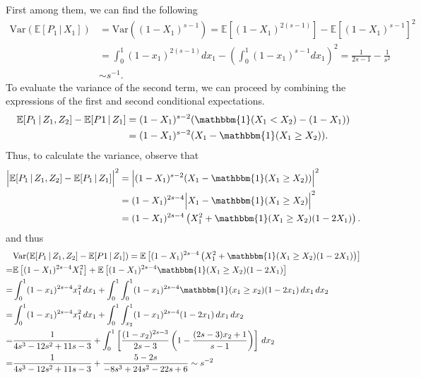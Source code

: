 \documentclass[letterpaper,10pt]{article}
\numberwithin{equation}{section}
\numberwithin{thm}{section}
\numberwithin{lem}{section}
\numberwithin{cor}{section}
\newcommand{\E}{\mathbb{E}}
\newcommand{\1}{\mathbb{1}}
\newcommand{\Var}{\text{Var}}
\begin{document}
First among them, we can find the following
\begin{equation*}
	\begin{aligned}
		\Var(\E[P_1 \, | \, X_1])
		 & = \Var\left((1-X_1)^{s-1}\right)
		= \E\left[(1-X_1)^{2(s-1)}\right] - \E\left[(1-X_1)^{s-1}\right]^2                         \\
		 & = \int_{0}^{1} (1-x_1)^{2(s-1)} d x_1 - \left(\int_{0}^{1} (1-x_1)^{s-1} d x_1\right)^2
		= \frac{1}{2s - 1} - \frac{1}{s^2}                                                         \\
		 & \sim s^{-1}.
	\end{aligned}
\end{equation*}
To evaluate the variance of the second term, we can proceed by combining the expressions of the first and second conditional expectations.
\begin{equation*}
	\begin{aligned}
		\E[P_1 \, | \, Z_1, Z_2] - \E[P1 \, | \, Z_1]
		 & = (1 - X_1)^{s-2} (\mathbbm{1}(X_1 < X_2) - (1 - X_1)) \\
		 & = (1 - X_1)^{s-2} (X_1 - \mathbbm{1}(X_1 \geq X_2)).
	\end{aligned}
\end{equation*}
Thus, to calculate the variance, observe that
\begin{equation*}
	\begin{aligned}
		\Big|\E[P_1 \, | \, Z_1, Z_2] - \E[P_1 \, | \, Z_1]\Big|^2
		 & = \Big|(1 - X_1)^{s-2} (X_1 - \mathbbm{1}(X_1 \geq X_2)) \Big|^2            \\
		 & = (1 - X_1)^{2s-4}\Big|X_1 - \mathbbm{1}(X_1 \geq X_2) \Big|^2              \\
		 & = (1 - X_1)^{2s-4}\left(X_1^2 + \mathbbm{1}(X_1 \geq X_2)(1 - 2X_1)\right).
	\end{aligned}
\end{equation*}
and thus
\begin{equation*}
	\begin{aligned}
		  & \Var(\E[P_1 \, | \, Z_1, Z_2] - \E[P1 \, | \, Z_1])
		= \E\left[(1 - X_1)^{2s-4}\left(X_1^2 + \mathbbm{1}(X_1 \geq X_2)(1 - 2X_1)\right)\right]                                                          \\
		= & \E\left[(1 - X_1)^{2s-4}X_1^2\right] + \E\left[(1 - X_1)^{2s-4}\mathbbm{1}(X_1 \geq X_2)(1 - 2X_1)\right]                                      \\
		= & \int_{0}^{1} (1 - x_1)^{2s-4}x_1^2 \, d x_1 + \int_{0}^{1}\int_{0}^{1}(1 - x_1)^{2s-4}\mathbbm{1}(x_1 \geq x_2)(1 - 2x_1) \, d x_1 \, d x_2    \\
		= & \int_{0}^{1} (1 - x_1)^{2s-4}x_1^2 \, d x_1 + \int_{0}^{1}\int_{x_2}^{1}(1 - x_1)^{2s-4}(1 - 2x_1) \, d x_1 \, d x_2                           \\
		= & \frac{1}{4s^3 - 12s^2 + 11s - 3} + \int_{0}^{1}\left[\frac{(1-x_2)^{2s-3}}{2s - 3}\left(1 - \frac{(2s - 3)x_2 + 1}{s-1}\right)\right] \, d x_2 \\
		= & \frac{1}{4s^3 - 12s^2 + 11s - 3} + \frac{5 - 2s}{-8s^3 + 24s^2 -22s + 6}
		\sim s^{-2}
	\end{aligned}
\end{equation*}
\end{document}
